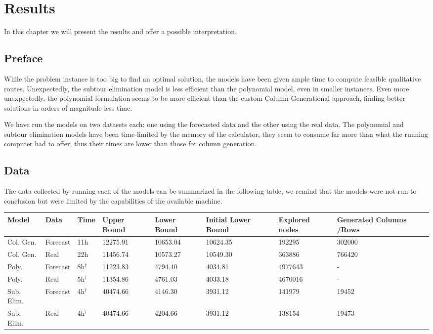 \chapter{Results}
\label{results}
In this chapter we will present the results and offer a possible interpretation.

\section{Preface}
While the problem instance is too big to find an optimal solution, the models have been given ample time to compute feasible qualitative routes. Unexpectedly, the subtour elimination model is less efficient than the polynomial model, even in smaller instances. Even more unexpectedly, the polynomial formulation seems to be more efficient than the custom Column Generational approach, finding better solutions in orders of magnitude less time.

We have run the models on two datasets each: one using the forecasted data and the other using the real data.
The polynomial and subtour elimination models have been time-limited by the memory of the calculator, they seem to consume far more than what the running computer had to offer, thus their times are lower than those for column generation.


\section{Data}
The data collected by running each of the models can be summarized in the following table, we remind that the models were not run to conclusion but were limited by the capabilities of the available machine.

\begin{tabular}{ |p{2cm}||p{1.5cm}|p{1cm}|p{1.6cm}|p{1.4cm}|p{}|p{1.5cm}|p{1.7cm}|  }
  \hline
  Model & Data & Time & Upper Bound & Lower Bound & Initial Lower Bound & Explored nodes & Generated Columns /Rows \\
  \hline
  Col. Gen. & Forecast & 11h & 12275.91 & 10653.04 & 10624.35 & 192295 & 302000 \\
  Col. Gen. & Real & 22h & 11456.74 & 10573.27 & 10549.30 & 363886 & 766420 \\
  Poly. & Forecast & 8h$^\dagger$ & 11223.83 & 4794.40 & 4034.81 & 4977643 & - \\
  Poly. & Real & 5h$^\dagger$ & 11354.86 & 4761.03 & 4033.18 & 4670016 & - \\
  Sub. Elim. & Forecast & 4h$^\dagger$ & 40474.66 & 4146.30 & 3931.12 & 141979 & 19452 \\
  Sub. Elim. & Real & 4h$^\dagger$ & 40474.66 & 4204.66 & 3931.12 & 138154 & 19473 \\
  \hline
\end{tabular}

